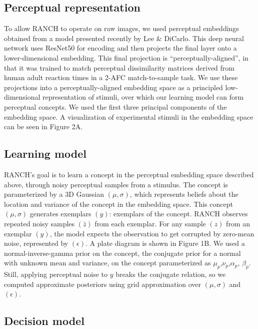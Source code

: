 \documentclass[10pt, letterpaper]{article}
\begin{document}
\hypertarget{perceptual-representation}{%
\subsection{Perceptual representation}\label{perceptual-representation}}

To allow RANCH to operate on raw images, we used perceptual embeddings
obtained from a model presented recently by Lee \& DiCarlo. This deep
neural network uses ResNet50 for encoding and then projects the final
layer onto a lower-dimensional embedding. This final projection is
``perceptually-aligned'', in that it was trained to match perceptual
dissimilarity matrices derived from human adult reaction times in a
2-AFC match-to-sample task. We use these projections into a
perceptually-aligned embedding space as a principled low-dimensional
representation of stimuli, over which our learning model can form
perceptual concepts. We used the first three principal components of the
embedding space. A visualization of experimental stimuli in the
embedding space can be seen in Figure 2A.

\hypertarget{learning-model}{%
\subsection{Learning model}\label{learning-model}}

RANCH's goal is to learn a concept in the perceptual embedding space
described above, through noisy perceptual samples from a stimulus. The
concept is parameterized by a 3D Gaussian \((\mu,\sigma)\), which
represents beliefs about the location and variance of the concept in the
embedding space. This concept \((\mu,\sigma)\) generates exemplars
\((y)\): exemplars of the concept. RANCH observes repeated noisy samples
\((\bar{z})\) from each exemplar. For any sample \((z)\) from an
exemplar \((y)\), the model expects the observation to get corrupted by
zero-mean noise, represented by \((\epsilon)\). A plate diagram is shown
in Figure 1B. We used a normal-inverse-gamma prior on the concept, the
conjugate prior for a normal with unknown mean and variance, on the
concept parameterized as \(\mu_{p}\),\(\nu_{p}\),\(\alpha_{p}\),
\(\beta_{p}\). Still, applying perceptual noise to \(y\) breaks the
conjugate relation, so we computed approximate posteriors using grid
approximation over \((\mu,\sigma)\) and \((\epsilon)\).

\hypertarget{decision-model}{%
\subsection{Decision model}\label{decision-model}}
\end{document}
